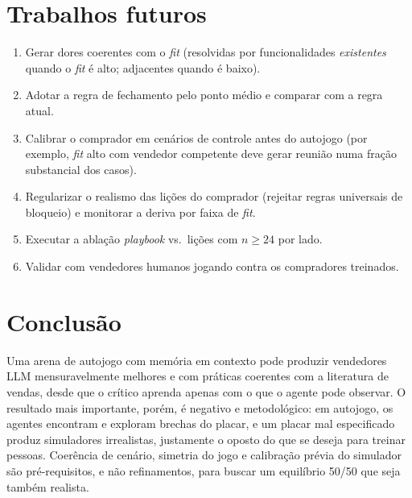 \documentclass[11pt,a4paper]{article}
\begin{document}
\section{Trabalhos futuros}
\begin{enumerate}
  \item Gerar dores coerentes com o \emph{fit} (resolvidas por funcionalidades \emph{existentes} quando o \emph{fit} é alto; adjacentes quando é baixo).
  \item Adotar a regra de fechamento pelo ponto médio e comparar com a regra atual.
  \item Calibrar o comprador em cenários de controle antes do autojogo (por exemplo, \emph{fit} alto com vendedor competente deve gerar reunião numa fração substancial dos casos).
  \item Regularizar o realismo das lições do comprador (rejeitar regras universais de bloqueio) e monitorar a deriva por faixa de \emph{fit}.
  \item Executar a ablação \emph{playbook} vs.\ lições com $n\ge24$ por lado.
  \item Validar com vendedores humanos jogando contra os compradores treinados.
\end{enumerate}

\section{Conclusão}
Uma arena de autojogo com memória em contexto pode produzir vendedores LLM mensuravelmente melhores e com práticas coerentes com a literatura de vendas, desde que o crítico aprenda apenas com o que o agente pode observar. O resultado mais importante, porém, é negativo e metodológico: em autojogo, os agentes encontram e exploram brechas do placar, e um placar mal especificado produz simuladores irrealistas, justamente o oposto do que se deseja para treinar pessoas. Coerência de cenário, simetria do jogo e calibração prévia do simulador são pré-requisitos, e não refinamentos, para buscar um equilíbrio 50/50 que seja também realista.
\end{document}
